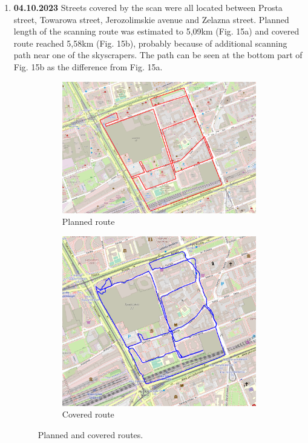 \documentclass[a4paper,12pt]{article}
\begin{document}
\begin{enumerate}
	\item \textbf{04.10.2023} Streets covered by the scan were all located between Prosta street, Towarowa street, Jerozolimskie avenue and Zelazna street. Planned length of the scanning route was estimated to 5,09km (Fig. 15a) and covered route reached 5,58km (Fig. 15b), probably because of additional scanning path near one of the skyscrapers. The path can be seen at the bottom part of Fig. 15b as the difference from Fig. 15a.
	\begin{figure}[H]
		\centering
		\begin{subfigure}{.90\textwidth}
			\centering
			\includegraphics[width=1\linewidth]{route_p14}
			\caption{Planned route}
			\label{fig:a14}
		\end{subfigure}%
		\linebreak
		\begin{subfigure}{.90\textwidth}
			\centering
			\includegraphics[width=1\linewidth]{route_c14}
			\caption{Covered route}
			\label{fig:b14}
		\end{subfigure}
		\caption{Planned and covered routes.}
		\label{fig:fig14}
	\end{figure} 
	\pagebreak
	

\end{enumerate}
\end{document}
